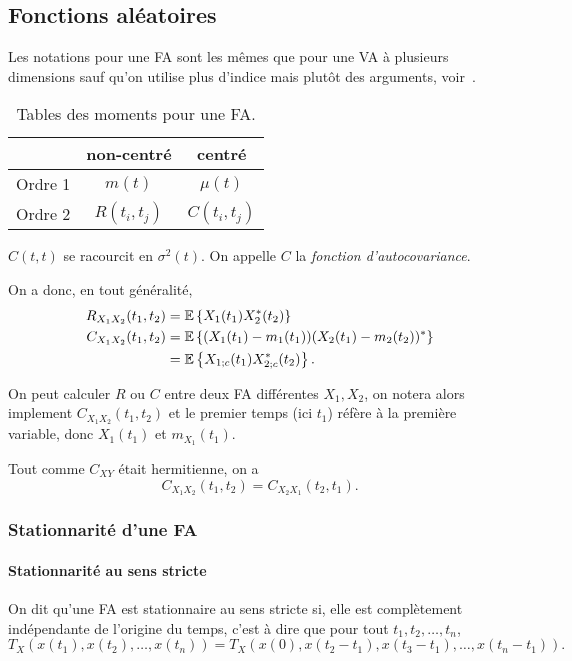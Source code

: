 \subsection{Fonctions aléatoires}
Les notations pour une FA sont les mêmes que pour une VA à plusieurs dimensions
sauf qu'on utilise plus d'indice mais plutôt des arguments,
voir~.
\begin{table}
  \centering
  \begin{tabular}{|l|c|c|}
    \hline
            & non-centré & centré\\
    \hline
    Ordre 1 & $m(t)$      & $\mu(t)$\\
    \hline
    Ordre 2 & $R(t_i,t_j)$   & $C(t_i,t_j)$\\ %
    \hline
  \end{tabular}
  \caption{Tables des moments pour une FA.}
  \label{tab:momentfun}
\end{table}
$C(t,t)$ se racourcit en $\sigma^2(t)$.
On appelle $C$ la \emph{fonction d'autocovariance}.

On a donc, en tout généralité,
\begin{align*}
  R_{X_1X_2}(t_1,t_2) & = \mathbb{E}\left\{X_1(t_1)X_2^*(t_2)\right\}\\
  C_{X_1X_2}(t_1,t_2) & = \mathbb{E}\left\{(X_1(t_1)-m_1(t_1))(X_2(t_1)-m_2(t_2))^*\right\}\\
                      & = \mathbb{E}\left\{X_{1;c}(t_1)X_{2;c}^*(t_2)\right\}.
\end{align*}

On peut calculer $R$ ou $C$ entre deux FA différentes $X_1,X_2$,
on notera alors implement $C_{X_1X_2}(t_1,t_2)$ et le premier temps
(ici $t_1$) réfère à la première variable, donc $X_1(t_1)$ et $m_{X_1}(t_1)$.

Tout comme $C_{XY}$ était hermitienne,
on a
\begin{equation}
  \label{eq:faherm}
  C_{X_1X_2}(t_1,t_2) = C_{X_2X_1}(t_2,t_1).
\end{equation}

\subsubsection{Stationnarité d'une FA}
\paragraph{Stationnarité au sens stricte}
On dit qu'une FA est stationnaire au sens stricte si,
elle est complètement indépendante de l'origine du temps,
c'est à dire que pour tout $t_1,t_2,\ldots,t_n$,
\[ T_X(x(t_1),x(t_2),\ldots,x(t_n)) = T_X(x(0),x(t_2-t_1),x(t_3-t_1),\ldots,x(t_n-t_1)). \]

